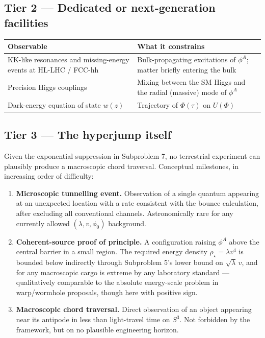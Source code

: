 \documentclass[11pt,a4paper]{article}
\begin{document}
\subsection{Tier 2 --- Dedicated or next-generation facilities}

\begin{table}[H]
\centering
\begin{tabularx}{\linewidth}{@{}p{5.5cm}X@{}}
\toprule
Observable & What it constrains \\
\midrule
KK-like resonances and missing-energy events at HL-LHC / FCC-hh & Bulk-propagating excitations of $\phi^A$; matter briefly entering the bulk \\
Precision Higgs couplings & Mixing between the SM Higgs and the radial (massive) mode of $\phi^A$ \\
Dark-energy equation of state $w(z)$ & Trajectory of $\Phi(\tau)$ on $U(\Phi)$ \\
\bottomrule
\end{tabularx}
\end{table}

\subsection{Tier 3 --- The hyperjump itself}

Given the exponential suppression in Subproblem 7, no terrestrial experiment can plausibly produce a macroscopic chord traversal. Conceptual milestones, in increasing order of difficulty:

\begin{enumerate}[leftmargin=*]
\item \textbf{Microscopic tunnelling event.} Observation of a single quantum appearing at an unexpected location with a rate consistent with the bounce calculation, after excluding all conventional channels. Astronomically rare for any currently allowed $(\lambda, v, \phi_0)$ background.
\item \textbf{Coherent-source proof of principle.} A configuration raising $\phi^A$ above the central barrier in a small region. The required energy density $\rho_\star = \lambda v^4$ is bounded below indirectly through Subproblem 5's lower bound on $\sqrt{\lambda}\,v$, and for any macroscopic cargo is extreme by any laboratory standard --- qualitatively comparable to the absolute energy-scale problem in warp/wormhole proposals, though here with positive sign.
\item \textbf{Macroscopic chord traversal.} Direct observation of an object appearing near its antipode in less than light-travel time on $S^3$. Not forbidden by the framework, but on no plausible engineering horizon.
\end{enumerate}
\end{document}
